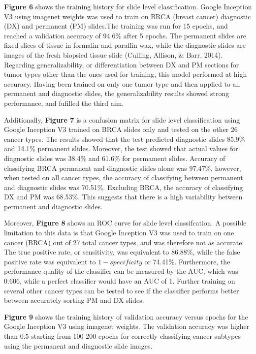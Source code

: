 \documentclass[12pt,]{article}
\begin{document}
\textbf{Figure 6} shows the training history for slide level
classification. Google Inception V3 using imagenet weights was used to
train on BRCA (breast cancer) diagnostic (DX) and permanent (PM)
slides.The training was run for 15 epochs, and reached a validation
accuracy of 94.6\% after 5 epochs. The permanent slides are fixed slices
of tissue in formalin and paraffin wax, while the diagnostic slides are
images of the fresh biopsied tissue slide (Culling, Allison, \& Barr,
2014). Regarding generalizability, or differentiation between DX and PM
sections for tumor types other than the ones used for training, this
model performed at high accuracy. Having been trained on only one tumor
type and then applied to all permanent and diagnostic slides, the
generalizability results showed strong performance, and fufilled the
third aim.

Additionally, \textbf{Figure 7} is a confusion matrix for slide level
classification using Google Inception V3 trained on BRCA slides only and
tested on the other 26 cancer types. The results showed that the test
predicted diagnostic slides 85.9\% and 14.1\% permanent slides.
Moreover, the test showed that actual values for diagnostic slides was
38.4\% and 61.6\% for permament slides. Accuracy of classifying BRCA
permanent and diagnostic slides alone was 97.47\%, however, when tested
on all cancer types, the accuracy of classifying between permanent and
diagnostic slides was 70.51\%. Excluding BRCA, the accuracy of
classifying DX and PM was 68.53\%. This suggests that there is a high
variability between permanent and diagnostic slides.

Moreover, \textbf{Figure 8} shows an ROC curve for slide level
classifcation. A possible limitation to this data is that Google
Inception V3 was used to train on one cancer (BRCA) out of 27 total
cancer types, and was therefore not as accurate. The true positive rate,
or sensitivity, was equivalent to 86.88\%, while the false positive rate
was equivalent to \(1 - specificity\) or 74.41\%. Furthermore, the
performance quality of the classifier can be measured by the AUC, which
was 0.606, while a perfect classifier would have an AUC of 1. Further
training on several other cancer types can be tested to see if the
classifier performs better between accurately sorting PM and DX slides.

\textbf{Figure 9} shows the training history of validation accuracy
versus epochs for the Google Inception V3 using imagenet weights. The
validation accuracy was higher than 0.5 starting from 100-200 epochs for
correctly classifying cancer subtypes using the permanent and diagnostic
slide images.
\end{document}

